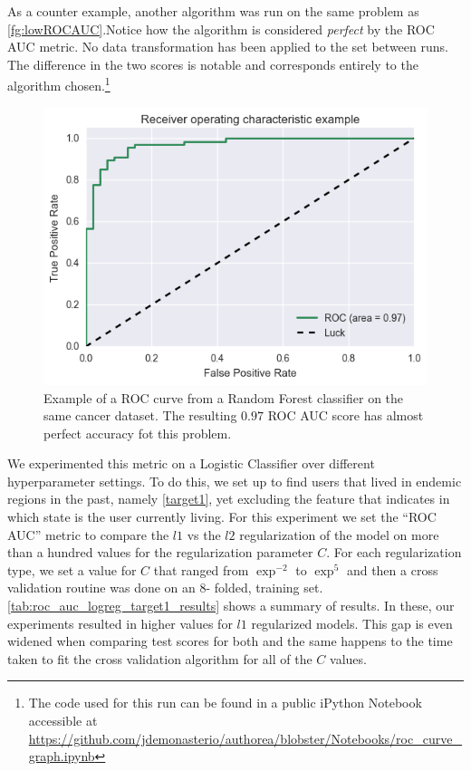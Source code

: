 
As a counter example, another algorithm was run on the same problem as \cref{fg:lowROCAUC}.Notice how the algorithm is considered \textit{perfect} by the ROC AUC metric.
No data transformation has been applied to the set between runs.
The difference in the two scores is notable and corresponds entirely to the algorithm chosen.\footnote{The code used for this run can be found in a public iPython Notebook accessible at \url{https://github.com/jdemonasterio/authorea/blobster/Notebooks/roc_curve_graph.ipynb}}

\begin{figure}[h!]
\begin{center}
\includegraphics[width=0.7\columnwidth]{figures/figure-highROCAUC/figure-highROCAUC}
\caption{Example of a ROC curve from a Random Forest classifier on the same cancer dataset.
The resulting $0.97$ ROC AUC score has almost perfect accuracy fot this problem.}
\end{center}
\end{figure}


We experimented this metric on a Logistic Classifier over different hyperparameter settings.
To do this, we set up to find users that lived in endemic regions in the past, namely \cref{target1}, yet excluding the feature that indicates in which state is the user currently living.
For this experiment we set the ``ROC AUC'' metric to compare the $l1$ vs the $l2$ regularization of the model on more than a hundred values for the regularization parameter $C$.
For each regularization type, we set a value for $C$ that ranged from $\exp^{-2}$ to $\exp^{5}$ and then a cross validation routine was done on an 8- folded, training set.
\cref{tab:roc_auc_logreg_target1_results} shows a summary of results.
In these, our experiments resulted in higher values for $l1$ regularized models.
This gap is even widened when comparing test scores for both and the same happens to the time taken to fit the cross validation algorithm for all of the $C$ values.


